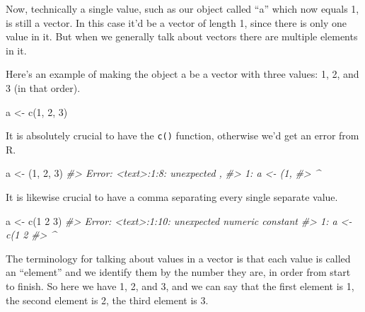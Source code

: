 \documentclass[
]{krantz}
\makeatletter
\newenvironment{Shaded}{\begin{snugshade}}{\end{snugshade}}
\newcommand{\CommentTok}[1]{\textcolor[rgb]{0.37,0.37,0.37}{\textit{#1}}}
\newcommand{\DecValTok}[1]{\textcolor[rgb]{0.06,0.06,0.06}{#1}}
\newcommand{\FunctionTok}[1]{\textcolor[rgb]{0,0,0}{#1}}
\newcommand{\NormalTok}[1]{#1}
\newcommand{\OtherTok}[1]{\textcolor[rgb]{0.37,0.37,0.37}{#1}}
\newenvironment{kframe}{%
\medskip{}
\setlength{\fboxsep}{.8em}
 \def\at@end@of@kframe{}%
 \ifinner\ifhmode%
  \def\at@end@of@kframe{\end{minipage}}%
  \begin{minipage}{\columnwidth}%
 \fi\fi%
 \def\FrameCommand##1{\hskip\@totalleftmargin \hskip-\fboxsep
 \colorbox{shadecolor}{##1}\hskip-\fboxsep
     \hskip-\linewidth \hskip-\@totalleftmargin \hskip\columnwidth}%
 \MakeFramed {\advance\hsize-\width
   \@totalleftmargin\z@ \linewidth\hsize
   \@setminipage}}%
 {\par\unskip\endMakeFramed%
 \at@end@of@kframe}
\renewenvironment{Shaded}{\begin{kframe}}{\end{kframe}}
\makeatother
\begin{document}
Now, technically a single value, such as our object called
``a'' which now equals 1, is still a vector. In this case
it'd be a vector of length 1, since there is only one value
in it. But when we generally talk about vectors there are
multiple elements in it.

Here's an example of making the object a be a vector with
three values: 1, 2, and 3 (in that order).

\begin{Shaded}
\begin{Highlighting}[]
\NormalTok{a }\OtherTok{\textless{}{-}} \FunctionTok{c}\NormalTok{(}\DecValTok{1}\NormalTok{, }\DecValTok{2}\NormalTok{, }\DecValTok{3}\NormalTok{)}
\end{Highlighting}
\end{Shaded}

It is absolutely crucial to have the \texttt{c()} function,
otherwise we'd get an error from R.

\begin{Shaded}
\begin{Highlighting}[]
\NormalTok{a }\OtherTok{\textless{}{-}}\NormalTok{ (}\DecValTok{1}\NormalTok{, }\DecValTok{2}\NormalTok{, }\DecValTok{3}\NormalTok{)}
\CommentTok{\#\textgreater{} Error: \textless{}text\textgreater{}:1:8: unexpected \textquotesingle{},\textquotesingle{}}
\CommentTok{\#\textgreater{} 1: a \textless{}{-} (1,}
\CommentTok{\#\textgreater{}            \^{}}
\end{Highlighting}
\end{Shaded}

It is likewise crucial to have a comma separating every
single separate value.

\begin{Shaded}
\begin{Highlighting}[]
\NormalTok{a }\OtherTok{\textless{}{-}} \FunctionTok{c}\NormalTok{(}\DecValTok{1} \DecValTok{2} \DecValTok{3}\NormalTok{)}
\CommentTok{\#\textgreater{} Error: \textless{}text\textgreater{}:1:10: unexpected numeric constant}
\CommentTok{\#\textgreater{} 1: a \textless{}{-} c(1 2}
\CommentTok{\#\textgreater{}              \^{}}
\end{Highlighting}
\end{Shaded}

The terminology for talking about values in a vector is that
each value is called an ``element'' and we identify them by
the number they are, in order from start to finish. So here
we have 1, 2, and 3, and we can say that the first element
is 1, the second element is 2, the third element is 3.
\end{document}
